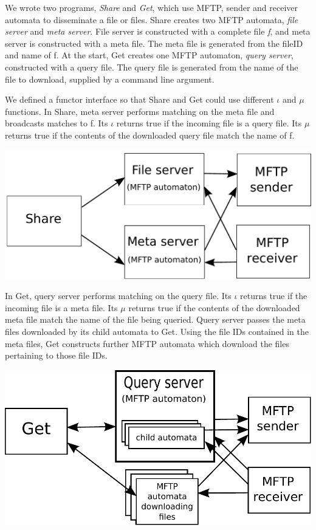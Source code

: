 \documentclass[letterpaper]{article}
\begin{document}
We wrote two programs, \emph{Share} and \emph{Get}, which use MFTP, sender and receiver automata to disseminate a file or files. %
Share creates two MFTP automata, \emph{file server} and \emph{meta server}.
File server is constructed with a complete file \emph{f}, and meta server is constructed with a meta file.
The meta file is generated from the fileID and name of f.
At the start, Get creates one MFTP automaton, \emph{query server}, constructed with a query file.
The query file is generated from the name of the file to download, supplied by a command line argument.

We defined a functor interface so that Share and Get could use different $\iota$ and $\mu$ functions.
In Share, meta server performs matching on the meta file and broadcasts matches to f.
Its $\iota$ returns true if the incoming file is a query file.
Its $\mu$ returns true if the contents of the downloaded query file match the name of f.

\vspace{2 mm}

\includegraphics[scale=0.55]{share_diagram}

\vspace{2 mm}

In Get, query server performs matching on the query file.
Its $\iota$ returns true if the incoming file is a meta file.
Its $\mu$ returns true if the contents of the downloaded meta file match the name of the file being queried.
Query server passes the meta files downloaded by its child automata to Get.
Using the file IDs contained in the meta files, Get constructs further MFTP automata which download the files pertaining to those file IDs.

\vspace{2.5 mm}

\includegraphics[scale=0.65]{get_diagram}
\end{document}
